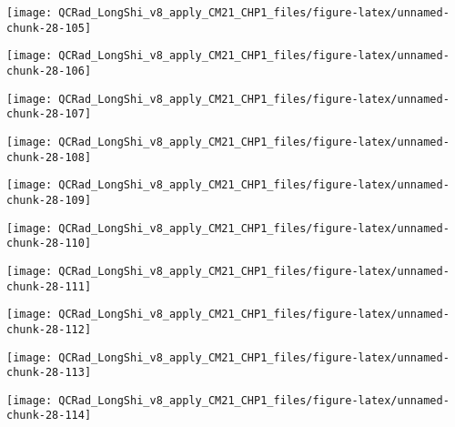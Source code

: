 \documentclass[
  10pt,
  a4paper,oneside]{article}
\begin{document}
\begin{center}\texttt{[image: QCRad\_LongShi\_v8\_apply\_CM21\_CHP1\_files/figure-latex/unnamed-chunk-28-105]} \end{center}

\begin{center}\texttt{[image: QCRad\_LongShi\_v8\_apply\_CM21\_CHP1\_files/figure-latex/unnamed-chunk-28-106]} \end{center}

\begin{center}\texttt{[image: QCRad\_LongShi\_v8\_apply\_CM21\_CHP1\_files/figure-latex/unnamed-chunk-28-107]} \end{center}

\begin{center}\texttt{[image: QCRad\_LongShi\_v8\_apply\_CM21\_CHP1\_files/figure-latex/unnamed-chunk-28-108]} \end{center}

\begin{center}\texttt{[image: QCRad\_LongShi\_v8\_apply\_CM21\_CHP1\_files/figure-latex/unnamed-chunk-28-109]} \end{center}

\begin{center}\texttt{[image: QCRad\_LongShi\_v8\_apply\_CM21\_CHP1\_files/figure-latex/unnamed-chunk-28-110]} \end{center}

\begin{center}\texttt{[image: QCRad\_LongShi\_v8\_apply\_CM21\_CHP1\_files/figure-latex/unnamed-chunk-28-111]} \end{center}

\begin{center}\texttt{[image: QCRad\_LongShi\_v8\_apply\_CM21\_CHP1\_files/figure-latex/unnamed-chunk-28-112]} \end{center}

\begin{center}\texttt{[image: QCRad\_LongShi\_v8\_apply\_CM21\_CHP1\_files/figure-latex/unnamed-chunk-28-113]} \end{center}

\begin{center}\texttt{[image: QCRad\_LongShi\_v8\_apply\_CM21\_CHP1\_files/figure-latex/unnamed-chunk-28-114]} \end{center}
\end{document}
